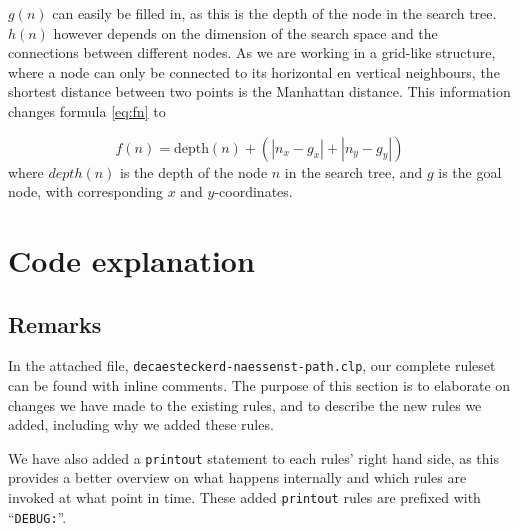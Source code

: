 \documentclass[12pt, a4paper]{article}
\begin{document}
$g(n)$ can easily be filled in, as this is the depth of the node in the search tree. $h(n)$ however depends on the dimension of the search space and the connections between different nodes. As we are working in a grid-like structure, where a node can only be connected to its horizontal en vertical neighbours, the shortest distance between two points is the Manhattan distance. This information changes formula \ref{eq:fn} to

\begin{equation*}
f(n) = \text{depth}(n) + \left(\left|n_x - g_x\right| + \left|n_y - g_y\right|\right)
\end{equation*}
where $depth(n)$ is the depth of the node $n$ in the search tree, and $g$ is the goal node, with corresponding $x$ and $y$-coordinates.

\section{Code explanation}
\subsection{Remarks}
In the attached file, \texttt{decaesteckerd-naessenst-path.clp}, our complete ruleset can be found with inline comments. The purpose of this section is to elaborate on changes we have made to the existing rules, and to describe the new rules we added, including why we added these rules.

We have also added a \texttt{printout} statement to each rules' right hand side, as this provides a better overview on what happens internally and which rules are invoked at what point in time. These added \texttt{printout} rules are prefixed with ``\texttt{DEBUG:}''.
\end{document}
